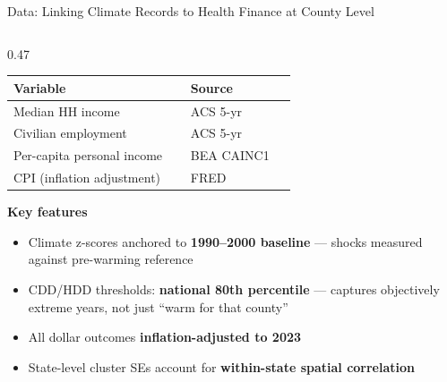 \documentclass[aspectratio=169,11pt]{beamer}
\newcommand{\emphcolor}[1]{{\color{WarmOrange}\textbf{#1}}}
\newcommand{\tealtext}[1]{{\color{Teal}#1}}
\begin{document}
\begin{frame}{Data: Linking Climate Records to Health Finance at County Level}
\begin{columns}[T]
\begin{column}{0.47\textwidth}
\begin{tabular}{@{}>{\raggedright\arraybackslash}p{0.58\linewidth}>{\raggedright\arraybackslash}p{0.34\linewidth}@{}}
        \toprule
        Variable & Source \\
        \midrule
        Median HH income & ACS 5-yr \\
        Civilian employment & ACS 5-yr \\
        Per-capita personal income & BEA CAINC1 \\
        CPI (inflation adjustment) & FRED \\
        \bottomrule
      \end{tabular}
      \vspace{0.4em}
      \textbf{\tealtext{Key features}}\\[0.2em]
      \begin{itemize}\itemsep0.14em
        \item Climate z-scores anchored to \emphcolor{1990--2000 baseline} — shocks measured against pre-warming reference
        \item CDD/HDD thresholds: \emphcolor{national 80th percentile} — captures objectively extreme years, not just ``warm for that county''
        \item All dollar outcomes \emphcolor{inflation-adjusted to 2023}
        \item State-level cluster SEs account for \emphcolor{within-state spatial correlation}
      \end{itemize}
    \end{column}
  \end{columns}
\end{frame}
\end{document}
